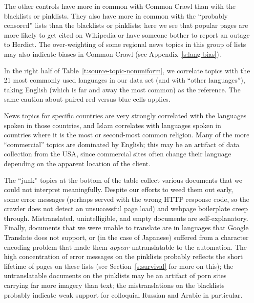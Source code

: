 The other controls have more in common with Common Crawl than with the
blacklists or pinklists.  They also have more in common with the
“probably censored” lists than the blacklists or pinklists; here we
see that popular pages are more likely to get cited on Wikipedia or
have someone bother to report an outage to Herdict.  The
over-weighting of some regional news topics in this group of lists may
also indicate biases in Common Crawl (see Appendix~\ref{s:lang-bias}).

In the right half of Table~\ref{t:source-topic-nonuniform}, we
correlate topics with the 21 most commonly used languages in our data
set (and with “other languages”), taking English (which is far and
away the most common) as the reference.  The same caution about paired
red versus blue cells applies.

News topics for specific countries are very strongly correlated with
the languages spoken in those countries, and Islam correlates with
languages spoken in countries where it is the most or second-most
common religion.  Many of the more “commercial” topics are dominated
by English; this may be an artifact of data collection from the USA,
since commercial sites often change their language depending on the
apparent location of the client.

The “junk” topics at the bottom of the table collect various documents
that we could not interpret meaningfully.  Despite our efforts to weed
them out early, some error messages (perhaps served with the wrong
HTTP response code, so the crawler does not detect an unsuccessful
page load) and webpage boilerplate creep through.  Mistranslated,
unintelligible, and empty documents are self-explanatory.  Finally,
documents that we were unable to translate are in languages that
Google Translate does not support, or (in the case of Japanese)
suffered from a character encoding problem that made them
\emph{appear} untranslatable to the automation.  The high
concentration of error messages on the pinklists probably reflects the
short lifetime of pages on these lists (see Section~\ref{s:survival}
for more on this); the untranslatable documents on the pinklists may
be an artifact of porn sites carrying far more imagery than text; the
mistranslations on the blacklists probably indicate weak support for
colloquial Russian and Arabic in particular.
